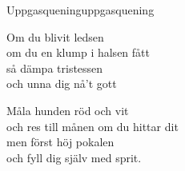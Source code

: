 \begin{song}{Uppgasquening}{uppgasquening}
\begin{vers}
Om du blivit ledsen\\
om du en klump i halsen fått\\
så dämpa tristessen \\
och unna dig nå't gott\\
\end{vers}
\begin{vers}
Måla hunden röd och vit\\
och res till månen om du hittar dit\\
men först höj pokalen\\
och fyll dig själv med sprit.\\
\end{vers}
\end{song}
